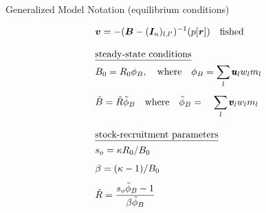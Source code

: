 \documentclass[final]{beamer} %
\begin{document}
\begin{frame}{}
\begin{columns}[t]
\begin{column}{.3\linewidth}
\begin{block}{\large Generalized Model Notation (equilibrium conditions)}
\begin{table}
\begin{align}
                & \bm{v}   = -(\bm{B} - (\bm{I}_n)_{l,l'})^{-1} (p[\bm{r}]) \quad \mbox{fished}   \label{T1.13b}\\[2ex]
                &\mbox{\underline{steady-state conditions}}\nonumber \\
                & B_0 = R_0 \phi_B, \quad\mbox{where} \quad \phi_B=  \sum_l \pmb{u}_{l} w_{l} m_{l} \label{T1.14}\\[1ex]
                & \tilde{B} = \tilde{R} \tilde{\phi}_B \quad\mbox{where}\quad \tilde{\phi}_B= \quad \sum_l \pmb{v}_{l} w_{l} m_{l} \label{T1.16}\\[2ex]
                &\mbox{\underline{stock-recruitment parameters}}\nonumber\\
                &s_o = \kappa R_0 / B_0 \label{T1.17}\\[1ex]
                &\beta = (\kappa -1)/B_0 \label{T1.18}\\[1ex]
                &\tilde{R} = \frac{s_o \tilde{\phi}_B -1}{\beta \tilde{\phi}_B} \label{T1.19}
              \end{align}
            \end{table}
        \end{block}

      \end{column}








\end{columns}
\end{frame}
\end{document}
